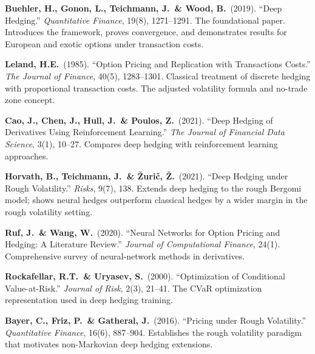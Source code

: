 \documentclass[11pt, a4paper]{article}
\theoremstyle{definition}
\theoremstyle{plain}
\theoremstyle{remark}
\begin{document}
\begin{enumerate}[label={[\arabic*]}, leftmargin=2cm]
    \item \textbf{Buehler, H., Gonon, L., Teichmann, J.\ \& Wood, B.}\ (2019).
          ``Deep Hedging.''
          \emph{Quantitative Finance}, 19(8), 1271--1291.
          The foundational paper.
          Introduces the framework, proves convergence,
          and demonstrates results for European and exotic options under transaction costs.

    \item \textbf{Leland, H.E.}\ (1985).
          ``Option Pricing and Replication with Transactions Costs.''
          \emph{The Journal of Finance}, 40(5), 1283--1301.
          Classical treatment of discrete hedging with proportional transaction costs.
          The adjusted volatility formula and no-trade zone concept.

    \item \textbf{Cao, J., Chen, J., Hull, J.\ \& Poulos, Z.}\ (2021).
          ``Deep Hedging of Derivatives Using Reinforcement Learning.''
          \emph{The Journal of Financial Data Science}, 3(1), 10--27.
          Compares deep hedging with reinforcement learning approaches.

    \item \textbf{Horvath, B., Teichmann, J.\ \& \v{Z}uri\v{c}, \v{Z}.}\ (2021).
          ``Deep Hedging under Rough Volatility.''
          \emph{Risks}, 9(7), 138.
          Extends deep hedging to the rough Bergomi model;
          shows neural hedges outperform classical hedges by a wider margin
          in the rough volatility setting.

    \item \textbf{Ruf, J.\ \& Wang, W.}\ (2020).
          ``Neural Networks for Option Pricing and Hedging: A Literature Review.''
          \emph{Journal of Computational Finance}, 24(1).
          Comprehensive survey of neural-network methods in derivatives.

    \item \textbf{Rockafellar, R.T.\ \& Uryasev, S.}\ (2000).
          ``Optimization of Conditional Value-at-Risk.''
          \emph{Journal of Risk}, 2(3), 21--41.
          The CVaR optimization representation used in deep hedging training.

    \item \textbf{Bayer, C., Friz, P.\ \& Gatheral, J.}\ (2016).
          ``Pricing under Rough Volatility.''
          \emph{Quantitative Finance}, 16(6), 887--904.
          Establishes the rough volatility paradigm that motivates
          non-Markovian deep hedging extensions.


\end{enumerate}
\end{document}
